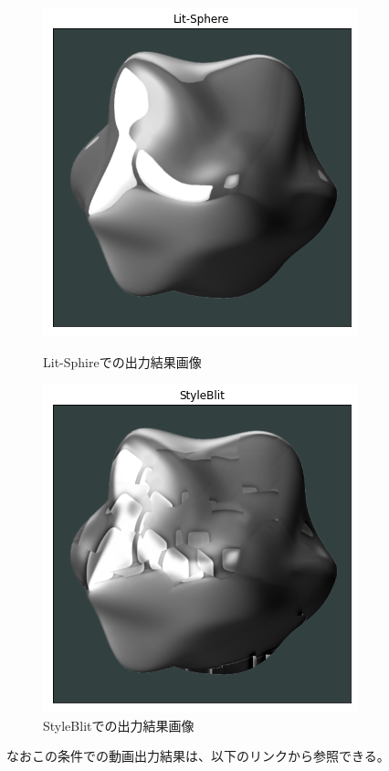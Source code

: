 \documentclass[dvipdfmx]{jsarticle}
\begin{document}
\begin{figure}[H]
 \begin{minipage}{0.5\hsize}
  \begin{center}
   \includegraphics[scale=0.4]{images/blo_lit_out3.png}
  \end{center}
  \caption{Lit-Sphireでの出力結果画像}
 \end{minipage}
 \begin{minipage}{0.5\hsize}
  \begin{center}
   \includegraphics[scale=0.4]{images/blo_stylr_out3.png}
  \end{center}
  \caption{StyleBlitでの出力結果画像}
 \end{minipage}
\end{figure}
なおこの条件での動画出力結果は、以下のリンクから参照できる。
\end{document}
